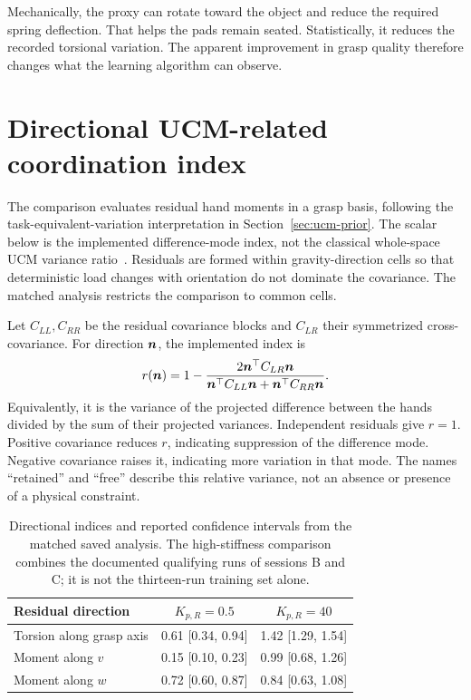 Mechanically, the proxy can rotate toward the object and reduce the required spring deflection. That helps the pads remain seated. Statistically, it reduces the recorded torsional variation. The apparent improvement in grasp quality therefore changes what the learning algorithm can observe.

\section{Directional UCM-related coordination index}

The comparison evaluates residual hand moments in a grasp basis, following the task-equivalent-variation interpretation in Section~\ref{sec:ucm-prior}. The scalar below is the implemented difference-mode index, not the classical whole-space UCM variance ratio~\cite{scholz1999}. Residuals are formed within gravity-direction cells so that deterministic load changes with orientation do not dominate the covariance. The matched analysis restricts the comparison to common cells.

Let $C_{LL},C_{RR}$ be the residual covariance blocks and $C_{LR}$ their symmetrized cross-covariance. For direction $\bm{n}$, the implemented index is
\begin{equation}
r(\bm{n})=1-
\frac{2\bm{n}^\top C_{LR}\bm{n}}
{\bm{n}^\top C_{LL}\bm{n}+\bm{n}^\top C_{RR}\bm{n}}.
\label{eq:directional-r}
\end{equation}
Equivalently, it is the variance of the projected difference between the hands divided by the sum of their projected variances. Independent residuals give $r=1$. Positive covariance reduces $r$, indicating suppression of the difference mode. Negative covariance raises it, indicating more variation in that mode. The names ``retained'' and ``free'' describe this relative variance, not an absence or presence of a physical constraint.

\begin{table}[htbp]\centering\small
\begin{tabular}{@{}lcc@{}}\toprule
Residual direction & $K_{p,R}=0.5$ & $K_{p,R}=40$\\
\midrule
Torsion along grasp axis & 0.61 [0.34, 0.94] & 1.42 [1.29, 1.54]\\
Moment along $v$ & 0.15 [0.10, 0.23] & 0.99 [0.68, 1.26]\\
Moment along $w$ & 0.72 [0.60, 0.87] & 0.84 [0.63, 1.08]\\
\bottomrule\end{tabular}
\caption{Directional indices and reported confidence intervals from the matched saved analysis. The high-stiffness comparison combines the documented qualifying runs of sessions B and C; it is not the thirteen-run training set alone.}
\label{tab:ucm-comparison}
\end{table}

